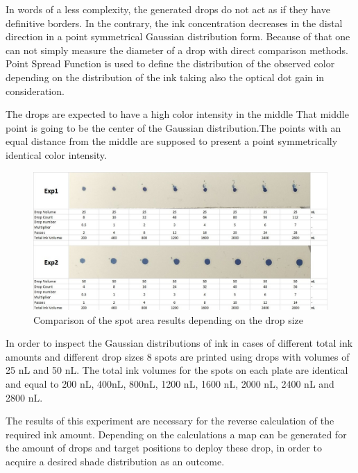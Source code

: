 In words of a less complexity, the generated drops do not act as if they have definitive borders. In the contrary, the ink concentration decreases in the distal direction in a point symmetrical Gaussian distribution form. Because of that one can not simply measure the diameter of a drop with direct comparison methods. Point Spread Function is used to define the distribution of the observed color depending on the distribution of the ink taking also the optical dot gain in consideration.

The drops are expected to have a high color intensity in the middle That middle point is going to be the center of the Gaussian distribution.The points with an equal distance from the middle are supposed to present a point symmetrically identical color intensity.

\bigskip

\begin{figure}[H]
	\centering
	\includegraphics[width=1\textwidth]{grafiken/psfprint.jpg}
	\caption{Comparison of the spot area results depending on the drop size}
	\label{fig:psfprint}
\end{figure} 

\bigskip

In order to inspect the Gaussian distributions of ink in cases of different total ink amounts and different drop sizes 8 spots are printed using drops with volumes of 25 nL and 50 nL. The total ink volumes for the spots on each plate are identical and equal to 200 nL, 400nL, 800nL, 1200 nL, 1600 nL, 2000 nL, 2400 nL and 2800 nL.

The results of this experiment are necessary for the reverse calculation of the required ink amount. Depending on the calculations a map can be generated for the amount of drops and target positions to deploy these drop, in order to acquire a desired shade distribution as an outcome.  


\bigskip

